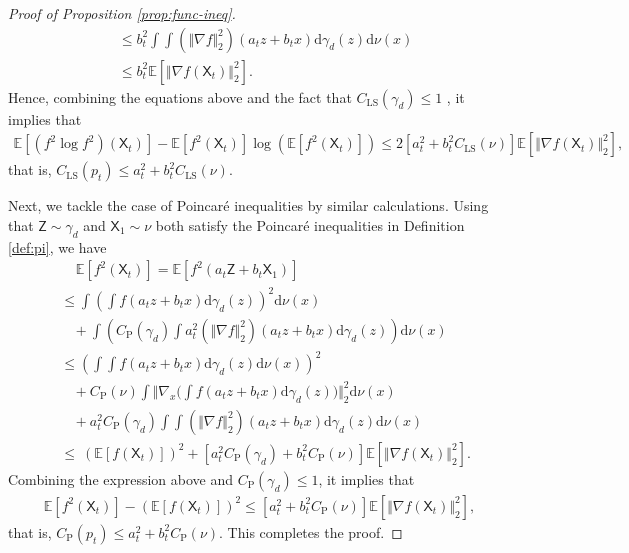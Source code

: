 \documentclass[twoside,11pt]{article}
\newcommand{\E}{\mathbb{E}}
\newcommand{\diff}{\mathrm{d}}
\numberwithin{equation}{section}
\begin{document}
\begin{proof} [Proof of Proposition \ref{prop:func-ineq}]
\begin{align*}
        & \le b_t^2 \int \int (\Vert \nabla f \Vert_2^2) (a_t z + b_t x) \diff \gamma_d(z) \diff \nu(x) \\
        & \le b_t^2 \E[\Vert \nabla f(\mathsf{X}_t) \Vert_2^2].
    \end{align*}
    Hence, combining the equations above and the fact that $C_{\mathrm{LS}}(\gamma_d) \le 1$ \citep{gross1975logarithmic}, it implies that
    \begin{align*}
        \E [(f^2 \log f^2) (\mathsf{X}_t)] - \E [f^2 (\mathsf{X}_t)] \log \left( \E [f^2 (\mathsf{X}_t)] \right)
        \le 2 \left[ a_t^2 + b_t^2 C_{\mathrm{LS}}(\nu) \right] \E[\Vert \nabla f(\mathsf{X}_t) \Vert_2^2],
    \end{align*}
    that is, $C_{\mathrm{LS}}(p_t) \le a_t^2 + b_t^2 C_{\mathrm{LS}}(\nu)$.

    Next, we tackle the case of Poincar{\'e} inequalities by similar calculations.
    Using that $\mathsf{Z} \sim \gamma_d$ and $\mathsf{X}_1 \sim \nu$ both satisfy the Poincar{\'e} inequalities in Definition \ref{def:pi}, we have
    \begin{align*}
        &~~~~~ \E [f^2(\mathsf{X}_t)]
        = \E [f^2 (a_t \mathsf{Z} + b_t \mathsf{X}_1)] \\
        &\le \int \left( \int f(a_t z + b_t x) \diff \gamma_d(z) \right)^2 \diff \nu(x) \\
        &~~~~ + \int \left( C_{\mathrm{P}}(\gamma_d) \int a_t^2 (\Vert \nabla f \Vert_2^2) (a_t z + b_t x) \diff \gamma_d(z) \right) \diff \nu(x) \\
        & \le \left( \int \int f(a_t z + b_t x) \diff \gamma_d(z) \diff \nu(x) \right)^2 \\
        &~~~~ + C_{\mathrm{P}}(\nu) \int \Big\Vert \nabla_x \Big(\int f(a_t z + b_t x) \diff \gamma_d(z) \Big) \Big\Vert_2^2 \diff \nu(x) \\
        &~~~~ + a_t^2 C_{\mathrm{P}}(\gamma_d) \int \int (\Vert \nabla f \Vert_2^2) (a_t z + b_t x) \diff \gamma_d(z) \diff \nu(x) \\
        & \le ~ \left( \E [f (\mathsf{X}_t)] \right)^2
        + \left[ a_t^2 C_{\mathrm{P}}(\gamma_d) + b_t^2 C_{\mathrm{P}}(\nu) \right] \E[\Vert \nabla f(\mathsf{X}_t) \Vert_2^2].
    \end{align*}
    Combining the expression above and $C_{\mathrm{P}}(\gamma_d) \le 1$, it implies that
    \begin{align*}
        \E [f^2(\mathsf{X}_t)] - \left( \E [f (\mathsf{X}_t)] \right)^2
        \le \left[ a_t^2 + b_t^2 C_{\mathrm{P}}(\nu) \right] \E[\Vert \nabla f(\mathsf{X}_t) \Vert_2^2],
    \end{align*}
    that is, $C_{\mathrm{P}}(p_t) \le a_t^2 + b_t^2 C_{\mathrm{P}}(\nu)$.
    This completes the proof.
\end{proof}
\end{document}
